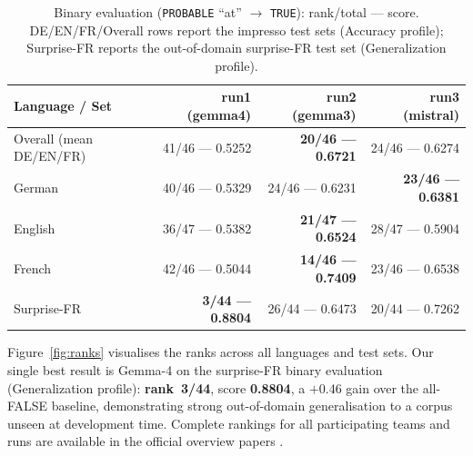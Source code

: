 \documentclass[
]{ceurart}
\theoremstyle{definition}
\begin{document}
\begin{table}[t]
\centering
\caption{Binary evaluation (\texttt{PROBABLE} ``at'' $\to$ \texttt{TRUE}): rank/total --- score. DE/EN/FR/Overall rows report the impresso test sets (Accuracy profile); Surprise-FR reports the out-of-domain surprise-FR test set (Generalization profile).}
\label{tab:test-binary}
\setlength{\tabcolsep}{4pt}
\begin{tabular}{lrrr}
\toprule
\textbf{Language / Set} & \textbf{run1 (gemma4)} & \textbf{run2 (gemma3)} & \textbf{run3 (mistral)} \\
\midrule
Overall (mean DE/EN/FR) & 41/46 --- 0.5252 & \textbf{20/46 --- 0.6721} & 24/46 --- 0.6274 \\
German                  & 40/46 --- 0.5329 & 24/46 --- 0.6231          & \textbf{23/46 --- 0.6381} \\
English                 & 36/47 --- 0.5382 & \textbf{21/47 --- 0.6524} & 28/47 --- 0.5904 \\
French                  & 42/46 --- 0.5044 & \textbf{14/46 --- 0.7409} & 23/46 --- 0.6538 \\
Surprise-FR             & \textbf{3/44 --- 0.8804}  & 26/44 --- 0.6473 & 20/44 --- 0.7262 \\
\bottomrule
\end{tabular}
\end{table}

Figure~\ref{fig:ranks} visualises the ranks across all languages and test sets.
Our single best result is Gemma-4 on the surprise-FR binary evaluation (Generalization profile): \textbf{rank~3/44}, score \textbf{0.8804}, a $+$0.46 gain over the all-FALSE baseline, demonstrating strong out-of-domain generalisation to a corpus unseen at development time.
Complete rankings for all participating teams and runs are available in the official overview papers \citep{opitz_extended_2026, opitz_overview_2026}.
\end{document}
